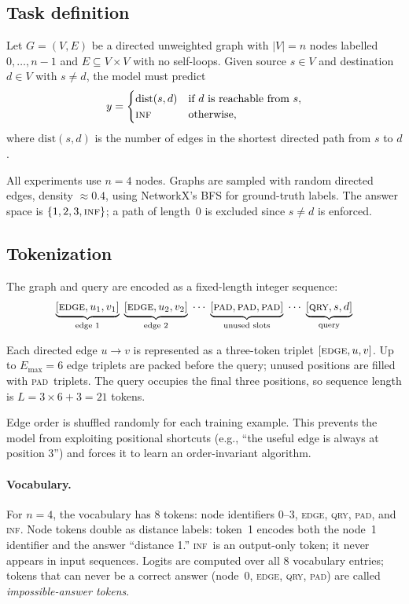 \documentclass[11pt, a4paper]{article}
\newcommand{\INF}{\textsc{inf}}
\newcommand{\PAD}{\textsc{pad}}
\newcommand{\EDGE}{\textsc{edge}}
\newcommand{\QRY}{\textsc{qry}}
\begin{document}
\subsection{Task definition}

Let $G = (V, E)$ be a directed unweighted graph with $|V| = n$ nodes
labelled $0, \ldots, n{-}1$ and $E \subseteq V \times V$ with no
self-loops.  Given source $s \in V$ and destination $d \in V$ with
$s \neq d$, the model must predict
\[
  y = \begin{cases}
    \mathrm{dist}(s, d) & \text{if } d \text{ is reachable from } s, \\
    \INF                & \text{otherwise,}
  \end{cases}
\]
where $\mathrm{dist}(s, d)$ is the number of edges in the shortest
directed path from $s$ to $d$.

All experiments use $n = 4$ nodes.  Graphs are sampled with random
directed edges, density $\approx 0.4$, using NetworkX's BFS for
ground-truth labels.  The answer space is $\{1, 2, 3, \INF\}$; a path
of length~0 is excluded since $s \neq d$ is enforced.

\subsection{Tokenization}

The graph and query are encoded as a fixed-length integer sequence:
\[
  \underbrace{[\EDGE, u_1, v_1]}_{\text{edge 1}}\;
  \underbrace{[\EDGE, u_2, v_2]}_{\text{edge 2}}\;
  \cdots\;
  \underbrace{[\PAD, \PAD, \PAD]}_{\text{unused slots}}\;
  \cdots\;
  \underbrace{[\QRY, s, d]}_{\text{query}}
\]

Each directed edge $u \to v$ is represented as a three-token triplet
$[\EDGE, u, v]$.  Up to $E_{\max} = 6$ edge triplets are packed
before the query; unused positions are filled with \PAD\ triplets.
The query occupies the final three positions, so sequence length is
$L = 3 \times 6 + 3 = 21$ tokens.

Edge order is shuffled randomly for each training example.  This
prevents the model from exploiting positional shortcuts (e.g., ``the
useful edge is always at position 3'') and forces it to learn an
order-invariant algorithm.

\paragraph{Vocabulary.}
For $n = 4$, the vocabulary has 8 tokens: node identifiers 0--3,
\EDGE, \QRY, \PAD, and \INF.  Node tokens double as distance labels:
token~1 encodes both the node~1 identifier and the answer
``distance 1.''  \INF\ is an output-only token; it never appears in
input sequences.  Logits are computed over all 8 vocabulary entries;
tokens that can never be a correct answer (node~0, \EDGE, \QRY, \PAD)
are called \emph{impossible-answer tokens}.
\end{document}
